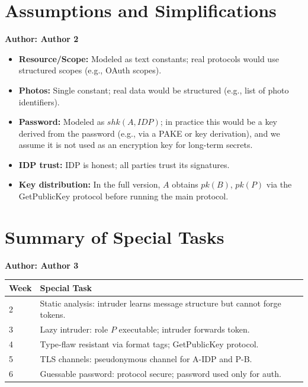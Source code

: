 \documentclass[11pt,a4paper]{article}
\begin{document}
\hrulefill

\section{Assumptions and Simplifications}
\textbf{Author: Author 2}

\begin{itemize}
  \item \textbf{Resource/Scope:} Modeled as text constants; real protocols would use structured scopes (e.g., OAuth scopes).
  \item \textbf{Photos:} Single constant; real data would be structured (e.g., list of photo identifiers).
  \item \textbf{Password:} Modeled as $shk(A,\mathit{IDP})$; in practice this would be a key derived from the password (e.g., via a PAKE or key derivation), and we assume it is not used as an encryption key for long-term secrets.
  \item \textbf{IDP trust:} IDP is honest; all parties trust its signatures.
  \item \textbf{Key distribution:} In the full version, $A$ obtains $\mathit{pk}(B)$, $\mathit{pk}(P)$ via the GetPublicKey protocol before running the main protocol.
\end{itemize}

\hrulefill

\section{Summary of Special Tasks}
\textbf{Author: Author 3}

\begin{center}
\begin{tabular}{ll}
\toprule
\textbf{Week} & \textbf{Special Task} \\
\midrule
2 & Static analysis: intruder learns message structure but cannot forge tokens. \\
3 & Lazy intruder: role $P$ executable; intruder forwards token. \\
4 & Type-flaw resistant via format tags; GetPublicKey protocol. \\
5 & TLS channels: pseudonymous channel for A-IDP and P-B. \\
6 & Guessable password: protocol secure; password used only for auth. \\
\bottomrule
\end{tabular}
\end{center}
\end{document}
